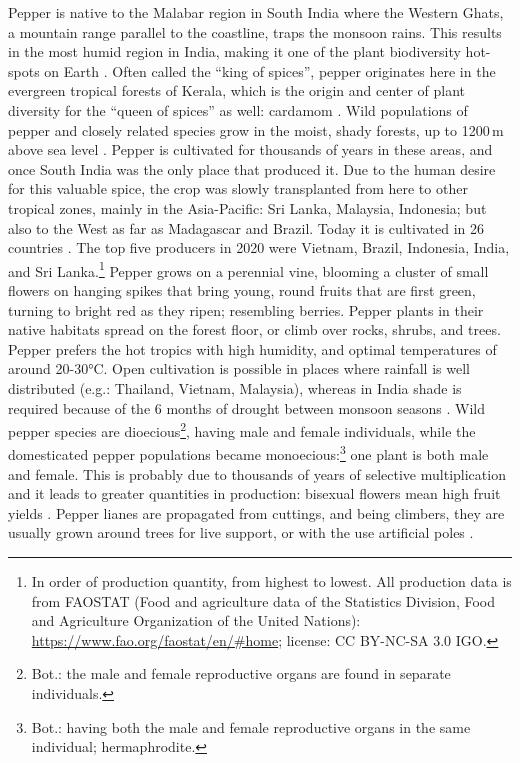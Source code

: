 Pepper is native to the Malabar region in South India where the Western Ghats, a mountain range parallel to the coastline, traps the monsoon rains. This results in the most humid region in India, making it one of the plant biodiversity hot-spots on Earth \autocite[1]{ravindran_black_2000}. Often called the ``king of spices'', pepper originates here in the evergreen tropical forests of Kerala, which is the origin and center of plant diversity for the ``queen of spices'' as well: cardamom \autocite[1]{ravindran_black_2000}.
Wild populations of pepper and closely related species grow in the moist, shady forests, up to 1200\,m above sea level \autocite{ravindran_piper_2017}. Pepper is cultivated for thousands of years in these areas, and once South India was the only place that produced it. Due to the human desire for this valuable spice, the crop was slowly transplanted from here to other tropical zones, mainly in the Asia-Pacific: Sri Lanka, Malaysia, Indonesia; but also to the West as far as Madagascar and Brazil. Today it is cultivated in 26 countries \autocite{ravindran_black_2000}. The top five producers in 2020 were Vietnam, Brazil, Indonesia, India, and Sri Lanka.\footnote{In order of production quantity, from highest to lowest. All production data is from FAOSTAT (Food and agriculture data of the Statistics Division, Food and Agriculture Organization of the United Nations): \url{https://www.fao.org/faostat/en/\#home}; license: CC BY-NC-SA 3.0 IGO.}
Pepper grows on a perennial vine, blooming a cluster of small flowers on hanging spikes that bring young, round fruits that are first green, turning to bright red as they ripen; resembling berries. Pepper plants in their native habitats spread on the forest floor, or climb over rocks, shrubs, and trees. Pepper prefers the hot tropics with high humidity, and optimal temperatures of around 20-30°C. Open cultivation is possible in places where rainfall is well distributed (e.g.: Thailand, Vietnam, Malaysia), whereas in India shade is required because of the 6 months of drought between monsoon seasons \autocite{ravindran_piper_2017}. Wild pepper species are dioecious\footnote{Bot.: the male and female reproductive organs are found in separate individuals.}, having male and female individuals, while the domesticated pepper populations became monoecious:\footnote{Bot.: having both the male and female reproductive organs in the same individual; hermaphrodite.} one plant is both male and female. This is probably due to thousands of years of selective multiplication and it leads to greater quantities in production: bisexual flowers mean high fruit yields \autocite[38]{ravindran_black_2000}.
Pepper lianes are propagated from cuttings, and being climbers, they are usually grown around trees for live support, or with the use artificial poles \autocite[216]{van_wyk_culinary_2014}. 

